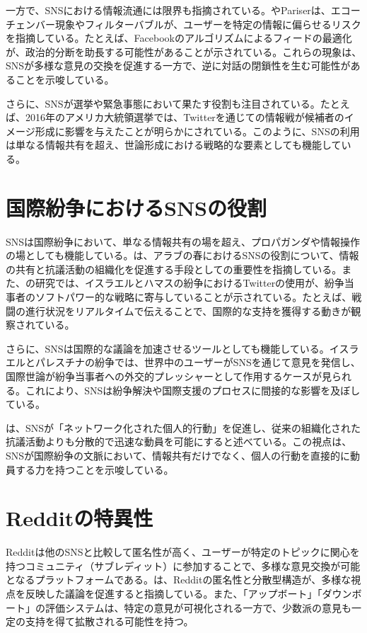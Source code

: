 \documentclass[11pt, a4j]{jreport}
\begin{document}
    一方で、SNSにおける情報流通には限界も指摘されている。\citet{sunstein2008democracy}やPariser\citet{pariser2011filter}は、エコーチェンバー現象やフィルターバブルが、ユーザーを特定の情報に偏らせるリスクを指摘している。たとえば、Facebookのアルゴリズムによるフィードの最適化が、政治的分断を助長する可能性があることが示されている。これらの現象は、SNSが多様な意見の交換を促進する一方で、逆に対話の閉鎖性を生む可能性があることを示唆している。

    さらに、SNSが選挙や緊急事態において果たす役割も注目されている。たとえば、2016年のアメリカ大統領選挙では、Twitterを通じての情報戦が候補者のイメージ形成に影響を与えたことが明らかにされている\citep{allcott-gentzkow2017}。このように、SNSの利用は単なる情報共有を超え、世論形成における戦略的な要素としても機能している。

    \section{国際紛争におけるSNSの役割}
    SNSは国際紛争において、単なる情報共有の場を超え、プロパガンダや情報操作の場としても機能している。\citet{hussain2013democracy}は、アラブの春におけるSNSの役割について、情報の共有と抗議活動の組織化を促進する手段としての重要性を指摘している。また、\citet{zeitzoff2017}の研究では、イスラエルとハマスの紛争におけるTwitterの使用が、紛争当事者のソフトパワー的な戦略に寄与していることが示されている。たとえば、戦闘の進行状況をリアルタイムで伝えることで、国際的な支持を獲得する動きが観察されている。

    さらに、SNSは国際的な議論を加速させるツールとしても機能している。イスラエルとパレスチナの紛争では、世界中のユーザーがSNSを通じて意見を発信し、国際世論が紛争当事者への外交的プレッシャーとして作用するケースが見られる。これにより、SNSは紛争解決や国際支援のプロセスに間接的な影響を及ぼしている。

    \citet{bennett2013logic}は、SNSが「ネットワーク化された個人的行動」を促進し、従来の組織化された抗議活動よりも分散的で迅速な動員を可能にすると述べている。この視点は、SNSが国際紛争の文脈において、情報共有だけでなく、個人の行動を直接的に動員する力を持つことを示唆している。

    \section{Redditの特異性}
    Redditは他のSNSと比較して匿名性が高く、ユーザーが特定のトピックに関心を持つコミュニティ（サブレディット）に参加することで、多様な意見交換が可能となるプラットフォームである。\citet{massanari2015participatory}は、Redditの匿名性と分散型構造が、多様な視点を反映した議論を促進すると指摘している。また、「アップボート」「ダウンボート」の評価システムは、特定の意見が可視化される一方で、少数派の意見も一定の支持を得て拡散される可能性を持つ。
\end{document}
